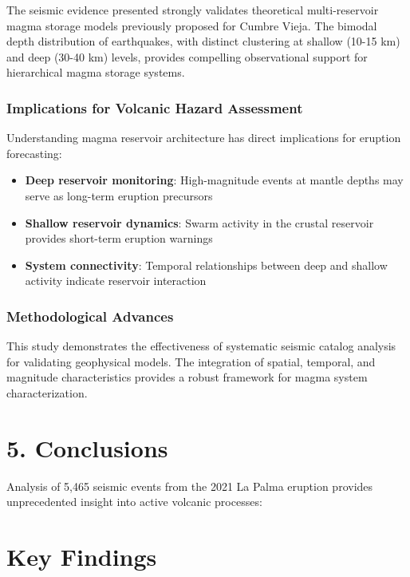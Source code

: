 \documentclass[
  letterpaper,
]{article}
\providecommand{\tightlist}{%
  \setlength{\itemsep}{0pt}\setlength{\parskip}{0pt}}
\begin{document}
The seismic evidence presented strongly validates theoretical
multi-reservoir magma storage models previously proposed for Cumbre
Vieja. The bimodal depth distribution of earthquakes, with distinct
clustering at shallow (10-15 km) and deep (30-40 km) levels, provides
compelling observational support for hierarchical magma storage systems.

\subsection{Implications for Volcanic Hazard
Assessment}\label{implications-for-volcanic-hazard-assessment}

Understanding magma reservoir architecture has direct implications for
eruption forecasting:

\begin{itemize}
\tightlist
\item
  \textbf{Deep reservoir monitoring}: High-magnitude events at mantle
  depths may serve as long-term eruption precursors
\item
  \textbf{Shallow reservoir dynamics}: Swarm activity in the crustal
  reservoir provides short-term eruption warnings
\item
  \textbf{System connectivity}: Temporal relationships between deep and
  shallow activity indicate reservoir interaction
\end{itemize}

\subsection{Methodological Advances}\label{methodological-advances}

This study demonstrates the effectiveness of systematic seismic catalog
analysis for validating geophysical models. The integration of spatial,
temporal, and magnitude characteristics provides a robust framework for
magma system characterization.


\chapter{5. Conclusions}\label{conclusions}

Analysis of 5,465 seismic events from the 2021 La Palma eruption
provides unprecedented insight into active volcanic processes:


\chapter{Key Findings}\label{key-findings}
\end{document}
